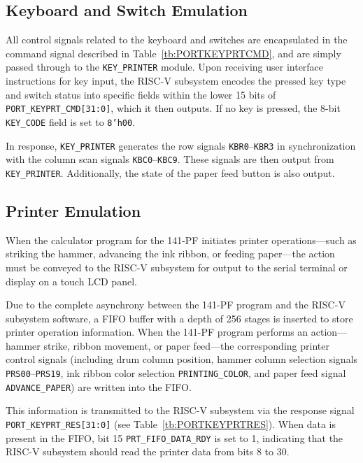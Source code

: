 \subsection{Keyboard and Switch Emulation}
All control signals related to the keyboard and switches are encapsulated in the command signal described in Table~\ref{tb:PORTKEYPRTCMD}, and are simply passed through to the \texttt{KEY\_PRINTER} module. Upon receiving user interface instructions for key input, the RISC-V subsystem encodes the pressed key type and switch status into specific fields within the lower 15 bits of \texttt{PORT\_KEYPRT\_CMD[31:0]}, which it then outputs. If no key is pressed, the 8-bit \texttt{KEY\_CODE} field is set to \texttt{8'h00}.

In response, \texttt{KEY\_PRINTER} generates the row signals \texttt{KBR0}--\texttt{KBR3} in synchronization with the column scan signals \texttt{KBC0}--\texttt{KBC9}. These signals are then output from \texttt{KEY\_PRINTER}. Additionally, the state of the paper feed button is also output.

\subsection{Printer Emulation}
When the calculator program for the 141-PF initiates printer operations—such as striking the hammer, advancing the ink ribbon, or feeding paper—the action must be conveyed to the RISC-V subsystem for output to the serial terminal or display on a touch LCD panel.

Due to the complete asynchrony between the 141-PF program and the RISC-V subsystem software, a FIFO buffer with a depth of 256 stages is inserted to store printer operation information. When the 141-PF program performs an action—hammer strike, ribbon movement, or paper feed—the corresponding printer control signals (including drum column position, hammer column selection signals \texttt{PRS00}--\texttt{PRS19}, ink ribbon color selection \texttt{PRINTING\_COLOR}, and paper feed signal \texttt{ADVANCE\_PAPER}) are written into the FIFO.

This information is transmitted to the RISC-V subsystem via the response signal \texttt{PORT\_KEYPRT\_RES[31:0]} (see Table~\ref{tb:PORTKEYPRTRES}). When data is present in the FIFO, bit 15 \texttt{PRT\_FIFO\_DATA\_RDY} is set to 1, indicating that the RISC-V subsystem should read the printer data from bits 8 to 30.

